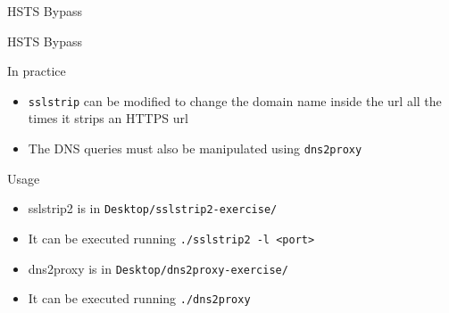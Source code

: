 \documentclass{beamer}
\begin{document}
\begin{frame}{HSTS Bypass}
\end{frame}
\begin{frame}{HSTS Bypass}
  \begin{block}{In practice}
  \begin{itemize}
      \item \texttt{sslstrip} can be modified to change the domain name inside the url all the times it strips an HTTPS url
      \item The DNS queries must also be manipulated using \texttt{dns2proxy}
    \end{itemize}
  \end{block}
  \begin{block}{Usage}
  \begin{itemize}
      \item sslstrip2 is in \texttt{Desktop/sslstrip2-exercise/}
      \item It can be executed running \texttt{./sslstrip2 -l <port>}
      \item dns2proxy is in \texttt{Desktop/dns2proxy-exercise/}
      \item It can be executed running \texttt{./dns2proxy}
  \end{itemize}
  \end{block}
\end{frame}
\end{document}
